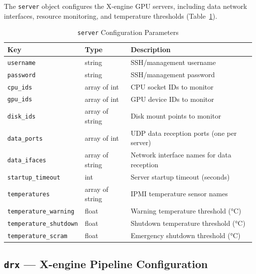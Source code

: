 The \texttt{server} object configures the X-engine GPU servers, including data network interfaces, resource monitoring, and temperature thresholds (Table~\ref{tab:config-server}).

\begin{table}[htbp]
    \centering
    \caption{\texttt{server} Configuration Parameters}
    \label{tab:config-server}
    \begin{tabular}{llp{7cm}}
        \toprule
        \textbf{Key} & \textbf{Type} & \textbf{Description} \\
        \midrule
        \texttt{username}             & string         & SSH/management username \\
        \texttt{password}             & string         & SSH/management password \\
        \texttt{cpu\_ids}             & array of int   & CPU socket IDs to monitor \\
        \texttt{gpu\_ids}             & array of int   & GPU device IDs to monitor \\
        \texttt{disk\_ids}            & array of string & Disk mount points to monitor \\
        \texttt{data\_ports}          & array of int   & UDP data reception ports (one per server) \\
        \texttt{data\_ifaces}         & array of string & Network interface names for data reception \\
        \texttt{startup\_timeout}     & int            & Server startup timeout (seconds) \\
        \texttt{temperatures}         & array of string & IPMI temperature sensor names \\
        \texttt{temperature\_warning} & float          & Warning temperature threshold (\si{\degreeCelsius}) \\
        \texttt{temperature\_shutdown}& float          & Shutdown temperature threshold (\si{\degreeCelsius}) \\
        \texttt{temperature\_scram}   & float          & Emergency shutdown threshold (\si{\degreeCelsius}) \\
        \bottomrule
    \end{tabular}
\end{table}

\subsection{\texttt{drx} --- X-engine Pipeline Configuration}

